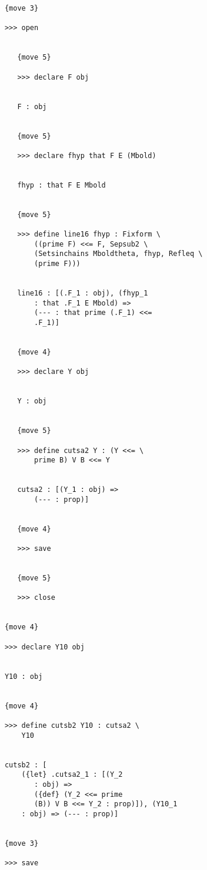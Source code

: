\documentclass[12pt]{article}
\begin{document}
\begin{verbatim}
            {move 3}

            >>> open


               {move 5}

               >>> declare F obj


               F : obj


               {move 5}

               >>> declare fhyp that F E (Mbold)


               fhyp : that F E Mbold


               {move 5}

               >>> define line16 fhyp : Fixform \
                   ((prime F) <<= F, Sepsub2 \
                   (Setsinchains Mboldtheta, fhyp, Refleq \
                   (prime F)))


               line16 : [(.F_1 : obj), (fhyp_1 
                   : that .F_1 E Mbold) => 
                   (--- : that prime (.F_1) <<= 
                   .F_1)]


               {move 4}

               >>> declare Y obj


               Y : obj


               {move 5}

               >>> define cutsa2 Y : (Y <<= \
                   prime B) V B <<= Y


               cutsa2 : [(Y_1 : obj) => 
                   (--- : prop)]


               {move 4}

               >>> save


               {move 5}

               >>> close


            {move 4}

            >>> declare Y10 obj


            Y10 : obj


            {move 4}

            >>> define cutsb2 Y10 : cutsa2 \
                Y10


            cutsb2 : [
                ({let} .cutsa2_1 : [(Y_2 
                   : obj) => 
                   ({def} (Y_2 <<= prime 
                   (B)) V B <<= Y_2 : prop)]), (Y10_1 
                : obj) => (--- : prop)]


            {move 3}

            >>> save



\end{verbatim}
\end{document}
